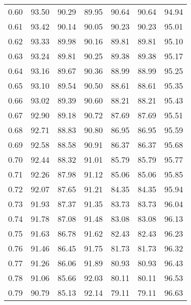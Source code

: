 \begin{tabular}{|c|c|c|c|c|c|c|}
      0.60 &     93.50 &     90.29 &      89.95 &   90.64 &      90.64 &         94.94 \\
      0.61 &     93.42 &     90.14 &      90.05 &   90.23 &      90.23 &         95.01 \\
      0.62 &     93.33 &     89.98 &      90.16 &   89.81 &      89.81 &         95.10 \\
      0.63 &     93.24 &     89.81 &      90.25 &   89.38 &      89.38 &         95.17 \\
      0.64 &     93.16 &     89.67 &      90.36 &   88.99 &      88.99 &         95.25 \\
      0.65 &     93.10 &     89.54 &      90.50 &   88.61 &      88.61 &         95.35 \\
      0.66 &     93.02 &     89.39 &      90.60 &   88.21 &      88.21 &         95.43 \\
      0.67 &     92.90 &     89.18 &      90.72 &   87.69 &      87.69 &         95.51 \\
      0.68 &     92.71 &     88.83 &      90.80 &   86.95 &      86.95 &         95.59 \\
      0.69 &     92.58 &     88.58 &      90.91 &   86.37 &      86.37 &         95.68 \\
      0.70 &     92.44 &     88.32 &      91.01 &   85.79 &      85.79 &         95.77 \\
      0.71 &     92.26 &     87.98 &      91.12 &   85.06 &      85.06 &         95.85 \\
      0.72 &     92.07 &     87.65 &      91.21 &   84.35 &      84.35 &         95.94 \\
      0.73 &     91.93 &     87.37 &      91.35 &   83.73 &      83.73 &         96.04 \\
      0.74 &     91.78 &     87.08 &      91.48 &   83.08 &      83.08 &         96.13 \\
      0.75 &     91.63 &     86.78 &      91.62 &   82.43 &      82.43 &         96.23 \\
      0.76 &     91.46 &     86.45 &      91.75 &   81.73 &      81.73 &         96.32 \\
      0.77 &     91.26 &     86.06 &      91.89 &   80.93 &      80.93 &         96.43 \\
      0.78 &     91.06 &     85.66 &      92.03 &   80.11 &      80.11 &         96.53 \\
      0.79 &     90.79 &     85.13 &      92.14 &   79.11 &      79.11 &         96.63 \\

\end{tabular}
